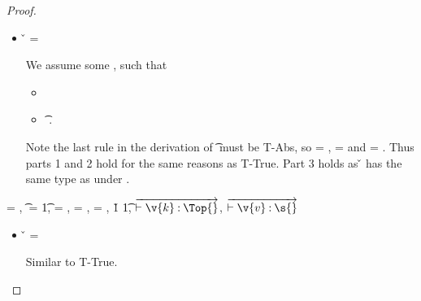 \begin{lemma}
\begin{proof}
\begin{case}[T-Clos]
  \begin{itemize}
    \item[]
      \begin{subcase}[B-Abs] \v{} = {\closure {\openv{}} {\abs {\x{}} {\s{}} {}}}

        We assume some \propenvp{}, such that
        \begin{itemize}
          \item \satisfies{\openv{}}{\propenvp{}}
          \item \judgement {\propenvp{}} {\abs {\x{}} {\s{}} {}} {\t{}}
                           {\filterset {\thenprop {\prop{}}}
                                       {\elseprop {\prop{}}}}
                           {\object{}}.
       \end{itemize}
       Note the last rule in the derivation of
          \judgement {\propenvp{}} {\abs {\x{}} {\s{}} {}} {\t{}}
                           {\filterset {\thenprop {\prop{}}}
                                       {\elseprop {\prop{}}}}
                           {\object{}}
                           must be T-Abs, so 
                           {\thenprop {\prop{}}} = {\topprop{}},
                           {\elseprop {\prop{}}} = {\botprop{}}
                           and {\object{}} = {\emptyobject{}}.
         Thus parts 1 and 2 hold for the same reasons as T-True.
         Part 3 holds as \v{} has the same type as {\abs {\x{}} {\s{}} {}}
         under \propenvp{}.

      \end{subcase} 
  \end{itemize}
\end{case}

\begin{case}[T-Multi] \e{} = { {}},
  \t{} = {\MultiFntype {\s{}} {\t{1}}},
  {\thenprop {\prop{}}} = {\topprop{}},
  {\elseprop{\prop{}}} = {\botprop{}},
  {\object{}} = {\emptyobject{}},
  \judgementtwo {} {\v{1}} {\t{1}},
  $\overrightarrow{\judgementtwo{}{\v{k}}{\Top{}}}$,
  $\overrightarrow{\judgementtwo{}{\v{v}}{\s{}}}$

  \begin{itemize}
    \item[]
      \begin{subcase}[B-Val] \v{} = { {}}

        Similar to T-True.
      \end{subcase}
  \end{itemize}


\end{case}
\end{proof}
\end{lemma}
